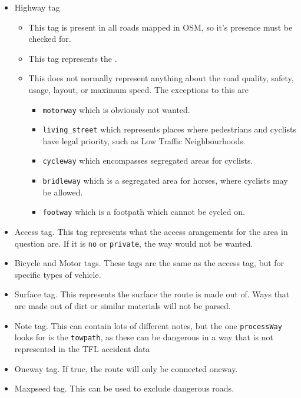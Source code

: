 \documentclass[11pt,twoside,a4paper]{article}
\begin{document}
\begin{itemize}
    \item Highway tag
    \begin{itemize}
        \item This tag is present in all roads mapped in OSM, so it's presence must be checked for.
        \item This tag represents the \cite{osmhighwayspage}.
        \item This does not normally represent anything about the road quality, safety, usage, layout, or maximum speed. The exceptions to this are
        \begin{itemize}
            \item \texttt{motorway} which is obviously not wanted.
            \item \texttt{living\_street} which represents places where pedestrians and cyclists have legal priority, such as Low Traffic Neighbourhoods.
            \item \texttt{cycleway} which encompasses segregated areas for cyclists. 
            \item \texttt{bridleway} which is a segregated area for horses, where cyclists may be allowed.
            \item \texttt{footway} which is a footpath which cannot be cycled on.
        \end{itemize}
    \end{itemize}
    \item Access tag. This tag represents what the access arangements for the area in question are. If it is \texttt{no} or \texttt{private}, the way would not be wanted.
    \item Bicycle and Motor tags. These tags are the same as the access tag, but for specific types of vehicle.
    \item Surface tag. This represents the surface the route is made out of. Ways that are made out of dirt or similar materials will not be parsed.
    \item Note tag. This can contain lots of different notes, but the one \texttt{processWay} looks for is the \texttt{towpath}, as these can be dangerous in a way that is not represented in the TFL accident data
    \item Oneway tag. If true, the route will only be connected oneway.
    \item Maxpseed tag. This can be used to exclude dangerous roads.
\end{itemize}
\end{document}
